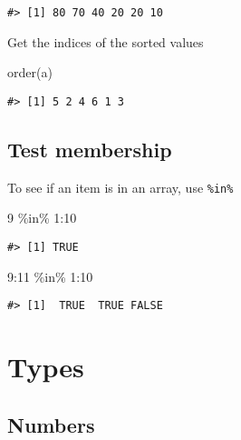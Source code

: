 \documentclass[
]{book}
\newenvironment{Shaded}{\begin{snugshade}}{\end{snugshade}}
\newcommand{\DecValTok}[1]{\textcolor[rgb]{0.00,0.00,0.81}{#1}}
\newcommand{\FunctionTok}[1]{\textcolor[rgb]{0.00,0.00,0.00}{#1}}
\newcommand{\NormalTok}[1]{#1}
\newcommand{\SpecialCharTok}[1]{\textcolor[rgb]{0.00,0.00,0.00}{#1}}
\begin{document}
\begin{verbatim}
#> [1] 80 70 40 20 20 10
\end{verbatim}

Get the indices of the sorted values

\begin{Shaded}
\begin{Highlighting}[]
\FunctionTok{order}\NormalTok{(a)}
\end{Highlighting}
\end{Shaded}

\begin{verbatim}
#> [1] 5 2 4 6 1 3
\end{verbatim}

\hypertarget{test-membership}{%
\section{Test membership}\label{test-membership}}

To see if an item is in an array, use \texttt{\%in\%}

\begin{Shaded}
\begin{Highlighting}[]
\DecValTok{9} \SpecialCharTok{\%in\%} \DecValTok{1}\SpecialCharTok{:}\DecValTok{10}
\end{Highlighting}
\end{Shaded}

\begin{verbatim}
#> [1] TRUE
\end{verbatim}

\begin{Shaded}
\begin{Highlighting}[]
\DecValTok{9}\SpecialCharTok{:}\DecValTok{11} \SpecialCharTok{\%in\%} \DecValTok{1}\SpecialCharTok{:}\DecValTok{10}
\end{Highlighting}
\end{Shaded}

\begin{verbatim}
#> [1]  TRUE  TRUE FALSE
\end{verbatim}

\hypertarget{types}{%
\chapter{Types}\label{types}}

\hypertarget{numbers}{%
\section{Numbers}\label{numbers}}
\end{document}
